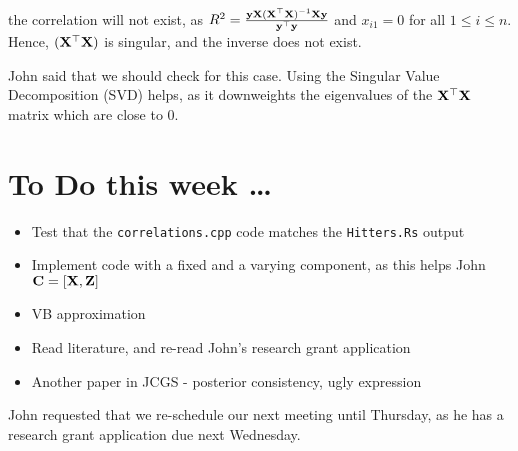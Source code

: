 \documentclass{amsart}
\begin{document}
the correlation will not exist, as $R^2 = \frac{{\bf y} {\bf X} ({\bf X}^\top {\bf X})^{-1} {\bf X} {\bf y}}{{\bf y}^\top {\bf y}}$ and
$x_{i1} = 0$ for all $1 \leq i \leq n$. Hence, $({\bf X}^\top {\bf X})$ is singular, and the inverse does not exist.

John said that we should check for this case. Using the Singular Value Decomposition (SVD) helps, as it
downweights the eigenvalues of the ${\bf X}^\top {\bf X}$ matrix which are close to 0.

\section{To Do this week \ldots}
\begin{itemize}
\item Test that the \texttt{correlations.cpp} code matches the \texttt{Hitters.Rs} output
\item Implement code with a fixed and a varying component, as this helps John ${\bf C} = [{\bf X}, {\bf Z}]$
\item VB approximation
\item Read literature, and re-read John's research grant application
\item Another paper in JCGS - posterior consistency, ugly expression
\end{itemize}

John requested that we re-schedule our next meeting until Thursday, as he has a research grant application
due next Wednesday.
\end{document}
